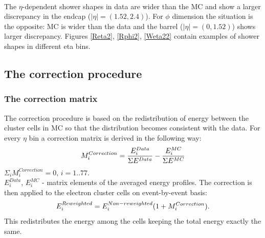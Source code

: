\\
The $\eta$-dependent shower shapes in data are wider than the MC and show a larger discrepancy in the endcap ($|\eta| = (1.52,2.4)$). For $\phi$ dimension the situation is the opposite: MC is wider than the data and the barrel ($|\eta| = (0,1.52)$) shows larger discrepancy. Figures \ref{Reta2}, \ref{Rphi2}, \ref{Weta22} contain examples of shower shapes in different eta bins. 
 \subsection{The correction procedure}
 \subsubsection{The correction matrix}
The correction procedure is based on the redistribution of energy between the cluster cells in MC so that the distribution becomes consistent with the data. For every $\eta$ bin a correction matrix is derived in the following way:
\begin{equation}
\nonumber
   \large {M_{i}^{Correction} = \frac{E_{i}^{Data}}{\Sigma E^{Data}} - \frac{E_{i}^{MC}}{\Sigma E^{MC}}}
\end{equation}
$\Sigma_i M_i^{Correction} = 0$, $i = 1..77$.\\
$E_i^{Data}$, $E_i^{MC}$ - matrix elements of the averaged energy profiles. 
The correction is then applied to the electron cluster cells on event-by-event basis:
\begin{equation}
\nonumber
   \large {E_{i}^{Reweighted} = {E_{i}^{Non-reweighted}(1+M_{i}^{Correction}).}}
\end{equation}
This redistributes the energy among the cells keeping the total energy exactly the same.
